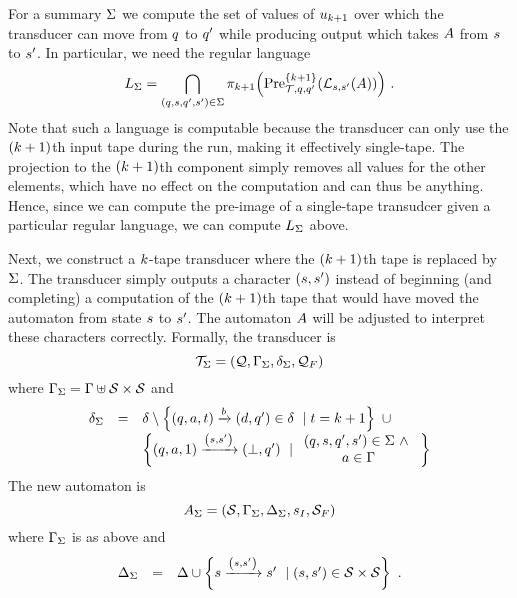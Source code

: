 For a summary $\summary$ we compute the set of values of
$\iword_{\numtapes+1}$
over which the transducer can move from $\tstate$ to $\tstate'$ while producing output which takes $\aut$ from $\astate$ to $\astate'$.
In particular, we need the regular language
\[
    \lang_\summary =
        \bigcap\limits_{
            \tup{\tstate, \astate, \tstate', \astate'}
            \in
            \summary
        }
        \ap{\proj{\numtapes+1}}{
            \preimageidx{\ducer}{\tstate}{\tstate'}{\set{\numtapes+1}}{
                \alangofstates{\aut}{\astate}{\astate'}
            }
        } \ .
\]
Note that such a language is computable because the transducer can only use the
$(\numtapes+1)$th
input tape during the run, making it effectively single-tape.
The projection to the
$(\numtapes+1)$th
component simply removes all values for the other elements, which have no effect on the computation and can thus be anything.
Hence, since we can compute the pre-image of a single-tape transudcer given a particular regular language, we can compute $\lang_\summary$ above.

Next, we construct a $\numtapes$-tape transducer where the
$(\numtapes+1)$th
tape is replaced by $\summary$.
The transducer simply outputs a character
$\tup{\astate, \astate'}$
instead of beginning (and completing) a computation of the
$(\numtapes+1)$th
tape that would have moved the automaton from state $\astate$ to $\astate'$.
The automaton $\aut$ will be adjusted to interpret these characters correctly.
Formally, the transducer is
\[
    \ducer_\summary =
        \tup{\tstates, \alphabet_\summary, \tdelta_\summary, \tfinals}
\]
where
$\alphabet_\summary = \alphabet \uplus \astates \times \astates$
and
\[
    \begin{array}{rcl}
        \tdelta_\summary
        &=&
        \tdelta \setminus
            \setcomp{
                \ttran{\tstate}{\cha}{\tidx}{\chb}{\tdir}{\tstate'}
                \in
                \tdelta
            }{\tidx = \numtapes + 1}
        \ \cup\ \\
        & &
        \setcomp{
            \ttran{\tstate}{\cha}{1}{\tup{\astate, \astate'}}{\tnoop}{\tstate'}
        }{
            \begin{array}{c}
                \tup{\tstate, \astate, \tstate', \astate'} \in \summary
                \ \land\ \\
                \cha \in \alphabet
            \end{array}
        }
    \end{array}
\]
The new automaton is
\[
    \aut_\summary =
        \tup{
            \astates,
            \alphabet_\summary,
            \adelta_\summary,
            \astateinit,
            \afinals
        }
\]
where $\alphabet_\summary$ is as above and
\[
    \begin{array}{rcl}
        \adelta_\summary
        &=&
        \adelta \cup
            \setcomp{\atran{\astate}{\tup{\astate, \astate'}}{\astate'}}
                    {\tup{\astate, \astate'} \in \astates \times \astates} \ .
    \end{array}
\]

